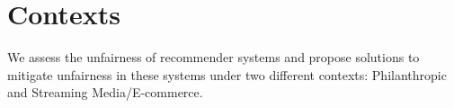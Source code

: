 





\section{Contexts}
    
    We assess the unfairness of recommender systems and propose solutions to mitigate unfairness in these systems under two different contexts: Philanthropic and Streaming Media/E-commerce.

